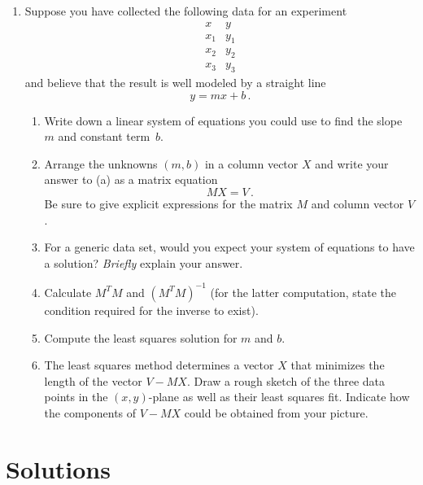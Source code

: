 \begin{enumerate}
\item Suppose you have collected the following data for an experiment
\[
\begin{array}{l|l}
x&y\\\hline
x_1&y_1\\
x_2&y_2\\
x_3&y_3
\end{array}
\]
and believe that the result is well modeled by a straight line
\[
y=mx+b\, .
\]
\begin{enumerate}
\item Write down a linear system of equations you could use to find the slope $m$ and constant term~$b$. 
\item Arrange the unknowns $(m,b)$ in a column vector $X$ and write your answer to (a) as a matrix equation \[M X= V\, .\]
Be sure to give explicit expressions for the matrix $M$ and column vector $V$.
\item For a generic data set, would you expect your system of equations to have a solution? {\itshape Briefly} explain your answer.
\item Calculate $M^T M$ and $(M^T M)^{-1}$ (for the latter computation, state the condition required for the inverse to exist).
\item Compute the least squares solution for $m$ and $b$.
\item The least squares method determines a vector $X$ that minimizes the length of the vector $V-MX$. Draw a rough sketch of
the three data points in the $(x,y)$-plane as well as their least squares fit. 
Indicate how the components of $V-MX$ could be obtained from your picture.

\end{enumerate}

\end{enumerate}

\section*{Solutions}

